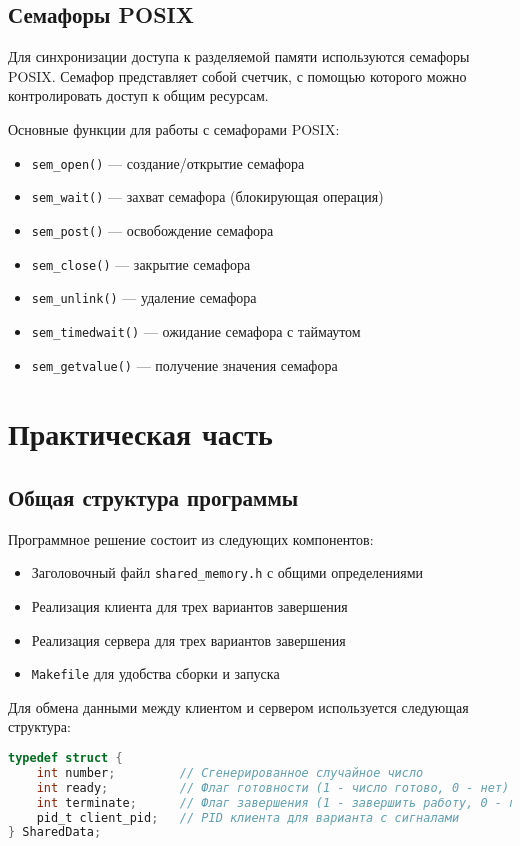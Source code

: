 \documentclass[a4paper,12pt]{article}
\begin{document}
\subsection{Семафоры POSIX}
Для синхронизации доступа к разделяемой памяти используются семафоры POSIX. Семафор представляет собой счетчик, с помощью которого можно контролировать доступ к общим ресурсам.

Основные функции для работы с семафорами POSIX:
\begin{itemize}
    \item \texttt{sem\_open()} — создание/открытие семафора
    \item \texttt{sem\_wait()} — захват семафора (блокирующая операция)
    \item \texttt{sem\_post()} — освобождение семафора
    \item \texttt{sem\_close()} — закрытие семафора
    \item \texttt{sem\_unlink()} — удаление семафора
    \item \texttt{sem\_timedwait()} — ожидание семафора с таймаутом
    \item \texttt{sem\_getvalue()} — получение значения семафора
\end{itemize}

\section{Практическая часть}

\subsection{Общая структура программы}

Программное решение состоит из следующих компонентов:
\begin{itemize}
    \item Заголовочный файл \texttt{shared\_memory.h} с общими определениями
    \item Реализация клиента для трех вариантов завершения
    \item Реализация сервера для трех вариантов завершения
    \item \texttt{Makefile} для удобства сборки и запуска
\end{itemize}

Для обмена данными между клиентом и сервером используется следующая структура:

\begin{lstlisting}[language=C, caption=Структура данных для обмена]
typedef struct {
    int number;         // Сгенерированное случайное число
    int ready;          // Флаг готовности (1 - число готово, 0 - нет)
    int terminate;      // Флаг завершения (1 - завершить работу, 0 - продолжать)
    pid_t client_pid;   // PID клиента для варианта с сигналами
} SharedData;
\end{lstlisting}
\end{document}
